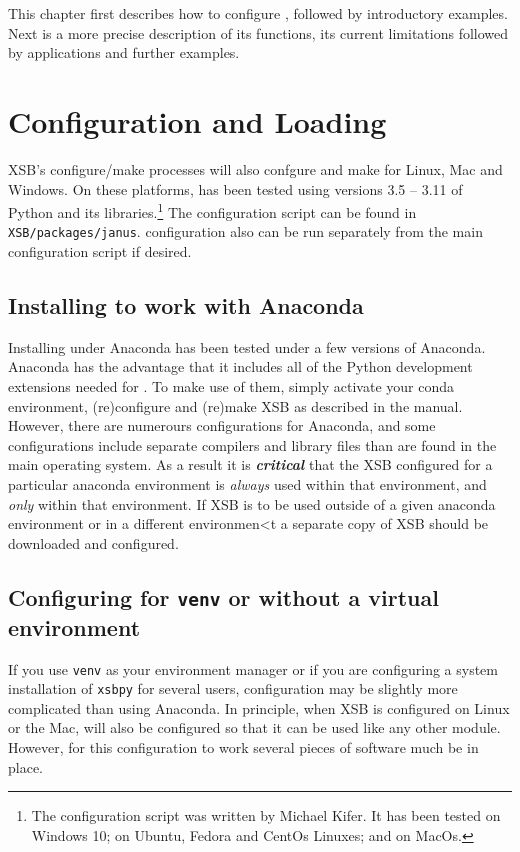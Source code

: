 
This chapter first describes how to configure \janusplg , followed by
introductory examples.  Next is a more precise description of its
functions, its current limitations followed by applications and
further examples.

\section{Configuration and Loading}

XSB's configure/make processes will also confgure and make \janus{}
for Linux, Mac and Windows.  On these platforms, \janusplg{} has been
tested using versions 3.5 -- 3.11 of Python and its
libraries.\footnote{The
\janusplg{} configuration script was written by Michael Kifer.  It has
been tested on Windows 10; on Ubuntu, Fedora and CentOs Linuxes; and
on MacOs.}  The \janusplg configuration script can be found in {\tt
XSB/packages/janus}.  \janusplg configuration also can be run
separately from the main configuration script if desired.

\subsection{Installing \janusplg{} to work with Anaconda}

Installing \janusplg under Anaconda has been tested under a few
versions of Anaconda.  Anaconda has the advantage that it includes all
of the Python development extensions needed for \janusplg.  To make
use of them, simply activate your conda environment, (re)configure and
(re)make XSB as described in the manual.  However, there are numerours
configurations for Anaconda, and some configurations include separate
compilers and library files than are found in the main operating
system.  As a result it is {\em {\bf critical}} that the XSB
configured for a particular anaconda environment is {\em always} used
within that environment, and {\em only} within that environment.  If
XSB is to be used outside of a given anaconda environment or in a
different environmen<t a separate copy of XSB should be downloaded and
configured.

\subsection{Configuring \janusplg{} for {\tt venv} or without a virtual environment} \label{sec:xsbpy-linux}

If you use {\tt venv} as your environment manager or if you are
configuring a system installation of {\tt xsbpy} for several users,
configuration may be slightly more complicated than using Anaconda.
In principle, when XSB is configured on Linux or the Mac, \janusplg{}
will also be configured so that it can be used like any other 
module.  However, for this configuration to work several pieces of
software much be in place.

